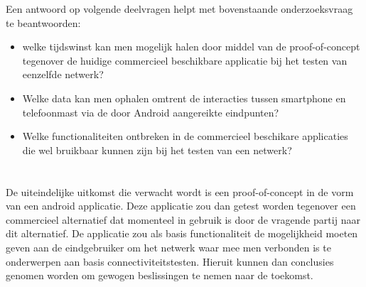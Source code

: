 Een antwoord op volgende deelvragen helpt met bovenstaande onderzoeksvraag te beantwoorden:

\begin{itemize}
    \item welke tijdswinst kan men mogelijk halen door middel van de proof-of-concept tegenover de huidige commercieel beschikbare applicatie bij het testen van eenzelfde netwerk?
    \item Welke data kan men ophalen omtrent de interacties tussen smartphone en telefoonmast via de door Android aangereikte eindpunten?
    \item Welke functionaliteiten ontbreken in de commercieel beschikare applicaties die wel bruikbaar kunnen zijn bij het testen van een netwerk?
\end{itemize}

\section{}%
\label{sec:onderzoeksdoelstelling}


De uiteindelijke uitkomst die verwacht wordt is een proof-of-concept in de vorm van een android applicatie. Deze applicatie zou dan getest worden tegenover een commercieel alternatief dat momenteel in gebruik is door de vragende partij naar dit alternatief. De applicatie zou als basis functionaliteit de mogelijkheid moeten geven aan de eindgebruiker om het netwerk waar mee men verbonden is te onderwerpen aan basis connectiviteitstesten. Hieruit kunnen dan conclusies genomen worden om gewogen beslissingen te nemen naar de toekomst.

\section{}%
\label{sec:opzet-bachelorproef}


